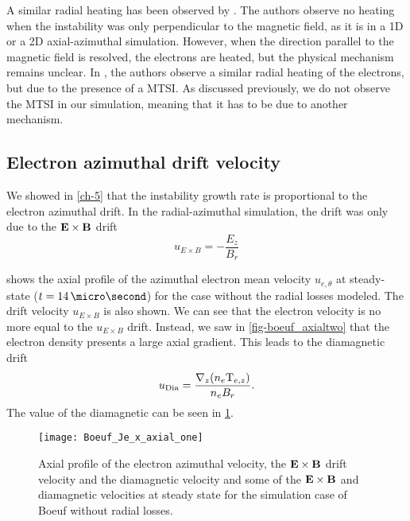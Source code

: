 A similar radial heating has been observed by \citet{heron2013}.
The authors observe no heating when the instability was only perpendicular to the magnetic field, as it is in a \ac{1D} or a \ac{2D} axial-azimuthal simulation.
However, when the direction parallel to the magnetic field is resolved, the electrons are heated, but the physical mechanism remains unclear.
In \citet{janhunen}, the authors observe a similar radial heating of the electrons, but due to the presence of a \ac{MTSI}.
As discussed previously, we do not observe the \ac{MTSI} in our simulation, meaning that it has to be due to another mechanism.


\subsection{Electron azimuthal drift velocity} \label{subsec-drift}

We showed in \cref{ch-5} that the instability growth rate is proportional to the electron azimuthal drift.
In the radial-azimuthal simulation, the drift was only due to the ${\mathbf E} \times {\mathbf B}$ drift
\begin{equation} \label{eq-exbdrift}
  u_{E \times B} = - \frac{E_z}{B_r}
\end{equation}

 shows the axial profile of the azimuthal electron mean velocity $u_{e, \theta}$ at steady-state ($t = 14\,\micro\second$) for the case without the radial losses modeled.
The drift velocity $u_{E \times B}$ is also shown.
We can see that the electron velocity is no more equal to the $u_{E \times B}$ drift.
Instead, we saw in \cref{fig-boeuf_axialtwo} that the electron density presents a large axial gradient.
This leads to the diamagnetic drift
$$u_{\rm Dia}=\frac{\nabla_z (n_e {\rm T}_{e,z})}{n_e B_r}.$$
The value of the diamagnetic can be seen in \cref{fig-Jetheta_sum}.


\begin{figure}[hbtp]
  \centering
  \texttt{[image: Boeuf\_Je\_x\_axial\_one]}
  \caption{Axial profile of the electron azimuthal velocity, the ${\mathbf E} \times {\mathbf B}$ drift velocity and the diamagnetic velocity and some of the ${\mathbf E} \times {\mathbf B}$ and diamagnetic velocities at steady state for the simulation case of Boeuf without radial losses.}
  \label{fig-Jetheta_sum}
\end{figure}

